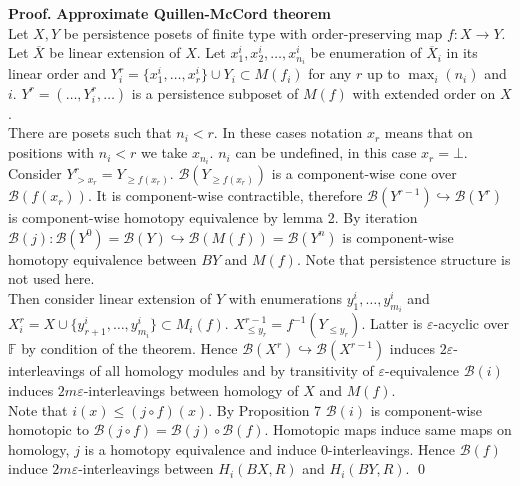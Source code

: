 \documentclass[a4paper, 12pt]{article}
\theoremstyle{definition}
\theoremstyle{remark}
\newenvironment{pf}{\noindent\textbf{Proof.}}{\qed}
\renewcommand{\leq}{\leqslant}
\renewcommand{\geq}{\geqslant}
\begin{document}
\begin{pf} \textbf{Approximate Quillen-McCord theorem}\\
  Let $X, Y$ be persistence posets of finite type with order-preserving map $f : X \to Y$.\\

  Let $\overline{X}$ be linear extension of $X$. Let $x^i_1, x^i_2, \ldots, x^i_{n_i}$ be enumeration of $\overline{X}_i$ in its linear order and $Y_i^r = \{x^i_1,\ldots,x^i_r\} \cup Y_i \subset M(f_i)$ for any $r$ up to $\max_{i}(n_i)$ and $i$. $Y^r = (\ldots, Y_i^r, \ldots)$ is a persistence subposet of $M(f)$ with extended order on $X$.\\

  There are posets such that $n_i < r$. In these cases notation $x_r$ means that on positions with $n_i < r$ we take $x_{n_i}$. $n_i$ can be undefined, in this case $x_r = \bot$.\\

  Consider $Y^r_{>x_r} = Y_{\geq f(x_r)}$. $\mathcal{B}(Y_{\geq f(x_r)})$ is a component-wise cone over $\mathcal{B}(f(x_r))$. It is component-wise contractible, therefore $\mathcal{B}(Y^{r-1}) \hookrightarrow \mathcal{B}(Y^{r})$ is component-wise homotopy equivalence by lemma 2. By iteration $\mathcal{B}(j) : \mathcal{B}(Y^{0}) = \mathcal{B}(Y) \hookrightarrow \mathcal{B}(M(f)) = \mathcal{B}(Y^n)$ is component-wise homotopy equivalence between $BY$ and $M(f)$. Note that persistence structure is not used here.\\

  Then consider linear extension of $Y$ with enumerations $y^i_1,\ldots,y^i_{m_i}$ and $X_i^r = X \cup \{y^i_{r+1},\ldots,y^i_{m_i}\} \subset M_i(f)$. $X^{r-1}_{\leq y_r} = f^{-1}(Y_{\leqslant y_r})$. Latter is $\varepsilon$-acyclic over $\mathbb{F}$ by condition of the theorem. Hence $\mathcal{B}(X^{r}) \hookrightarrow \mathcal{B}(X^{r-1})$ induces $2\varepsilon$-interleavings of all homology modules and by transitivity of $\varepsilon$-equivalence $\mathcal{B}(i)$ induces $2m\varepsilon$-interleavings between homology of $X$ and $M(f)$.\\

  Note that $i(x) \leqslant (j \circ f)(x)$. By Proposition 7 $\mathcal{B}(i)$ is component-wise homotopic to $\mathcal{B}(j \circ f) = \mathcal{B}(j) \circ \mathcal{B}(f)$. Homotopic maps induce same maps on homology, $j$ is a homotopy equivalence and induce $0$-interleavings. Hence $\mathcal{B}(f)$ induce $2m\varepsilon$-interleavings between $H_i(BX,R)$ and $H_i(BY,R)$.
\end{pf}
\end{document}
